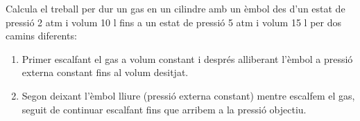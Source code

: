 \begin{exr}{}
    Calcula el treball per dur un gas en un cilindre amb un èmbol des d'un estat de pressió 2 atm i volum 10 l fins a un estat de pressió 5 atm i volum 15 l per dos camins diferents:
    \begin{enumerate}
    \item Primer escalfant el gas a volum constant i després alliberant l'èmbol a pressió externa constant fins al volum desitjat.
    \item Segon deixant l'èmbol lliure (pressió externa constant) mentre escalfem el gas, seguit de continuar escalfant fins que arribem a la pressió objectiu.  
    \end{enumerate}
    \end{exr}
